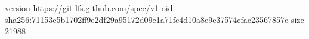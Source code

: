 version https://git-lfs.github.com/spec/v1
oid sha256:71153e5b1702ff9e2df29a95172d09e1a71fc4d10a8e9e37574cfac23567857c
size 21988
